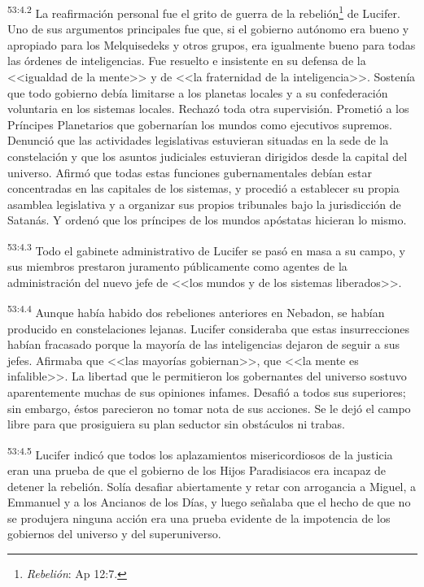 \par
\textsuperscript{53:4.2} La reafirmación personal fue el grito de guerra de la rebelión\footnote{\textit{Rebelión}: Ap 12:7.} de Lucifer. Uno de sus argumentos principales fue que, si el gobierno autónomo era bueno y apropiado para los Melquisedeks y otros grupos, era igualmente bueno para todas las órdenes de inteligencias. Fue resuelto e insistente en su defensa de la <<igualdad de la mente>> y de <<la fraternidad de la inteligencia>>. Sostenía que todo gobierno debía limitarse a los planetas locales y a su confederación voluntaria en los sistemas locales. Rechazó toda otra supervisión. Prometió a los Príncipes Planetarios que gobernarían los mundos como ejecutivos supremos. Denunció que las actividades legislativas estuvieran situadas en la sede de la constelación y que los asuntos judiciales estuvieran dirigidos desde la capital del universo. Afirmó que todas estas funciones gubernamentales debían estar concentradas en las capitales de los sistemas, y procedió a establecer su propia asamblea legislativa y a organizar sus propios tribunales bajo la jurisdicción de Satanás. Y ordenó que los príncipes de los mundos apóstatas hicieran lo mismo.

\par
\textsuperscript{53:4.3} Todo el gabinete administrativo de Lucifer se pasó en masa a su campo, y sus miembros prestaron juramento públicamente como agentes de la administración del nuevo jefe de <<los mundos y de los sistemas liberados>>.

\par
\textsuperscript{53:4.4} Aunque había habido dos rebeliones anteriores en Nebadon, se habían producido en constelaciones lejanas. Lucifer consideraba que estas insurrecciones habían fracasado porque la mayoría de las inteligencias dejaron de seguir a sus jefes. Afirmaba que <<las mayorías gobiernan>>, que <<la mente es infalible>>. La libertad que le permitieron los gobernantes del universo sostuvo aparentemente muchas de sus opiniones infames. Desafió a todos sus superiores; sin embargo, éstos parecieron no tomar nota de sus acciones. Se le dejó el campo libre para que prosiguiera su plan seductor sin obstáculos ni trabas.

\par
\textsuperscript{53:4.5} Lucifer indicó que todos los aplazamientos misericordiosos de la justicia eran una prueba de que el gobierno de los Hijos Paradisiacos era incapaz de detener la rebelión. Solía desafiar abiertamente y retar con arrogancia a Miguel, a Emmanuel y a los Ancianos de los Días, y luego señalaba que el hecho de que no se produjera ninguna acción era una prueba evidente de la impotencia de los gobiernos del universo y del superuniverso.

